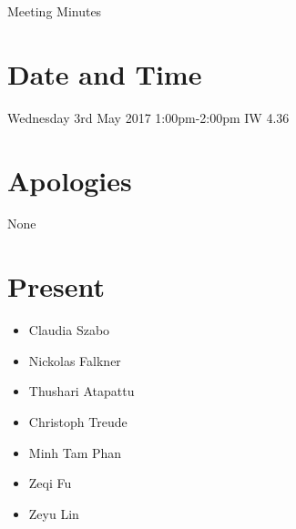 \documentclass[11pt, a4paper]{article}
\begin{document}
\vspace*{15pt}

\begin{center}
\huge Meeting Minutes




\end{center}

\section{Date and Time}
 Wednesday 3rd May 2017 1:00pm-2:00pm IW 4.36

\section{Apologies}
None

\section{Present}
\begin{itemize}
	\item Claudia Szabo
	\item Nickolas Falkner
	\item Thushari Atapattu 
	\item Christoph Treude 
	\item Minh Tam Phan
	\item Zeqi Fu
	\item Zeyu Lin
\end{itemize}
\end{document}
